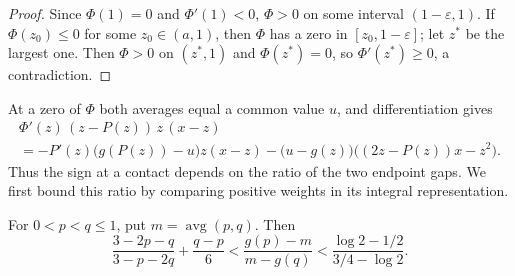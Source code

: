 \begin{proof}
Since $\Phi(1)=0$ and $\Phi'(1)<0$, $\Phi>0$ on some interval $(1-\varepsilon,1)$. If
$\Phi(z_0)\le0$ for some $z_0\in(a,1)$, then $\Phi$ has a zero in $[z_0,1-\varepsilon]$; let $z^*$
be the largest one. Then $\Phi>0$ on $(z^*,1)$ and $\Phi(z^*)=0$, so $\Phi'(z^*)\ge0$, a
contradiction.
\end{proof}

At a zero of $\Phi$ both averages equal a common value $u$, and differentiation gives
\begin{multline*}
  \Phi'(z)\,(z-P(z))\,z\,(x-z)\\
  =-P'(z)\bigl(g(P(z))-u\bigr)z(x-z)-\bigl(u-g(z)\bigr)\bigl((2z-P(z))x-z^2\bigr).
\end{multline*}
Thus the sign at a contact depends on the ratio of the two endpoint gaps. We first bound this
ratio by comparing positive weights in its integral representation.

\begin{lemma}\label{lem:ss-endpoint-gaps}
For $0<p<q\le1$, put $m=\operatorname{avg}(p,q)$. Then
\[
 \frac{3-2p-q}{3-p-2q}
 +\frac{q-p}{6}<\frac{g(p)-m}{m-g(q)}
 <\frac{\log2-1/2}{3/4-\log2}.
\]
\end{lemma}

